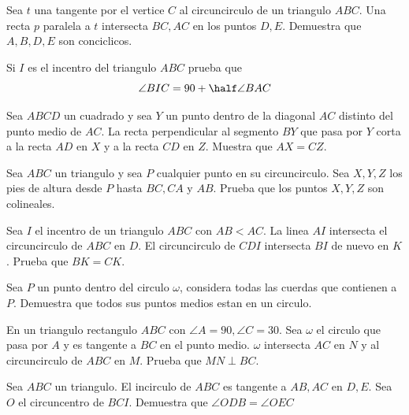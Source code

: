 \documentclass[11pt]{scrartcl}
\newcommand{\thmdifficulty}{0}
\newcommand{\problemdiff}[1]{\renewcommand{\thmdifficulty}{#1}}
\begin{document}
\problemdiff{1}
\begin{problema}
    Sea $t$ una tangente por el vertice $C$ al circuncirculo de un triangulo $ABC$. Una recta $p$ paralela a $t$ intersecta $BC,AC$ en los puntos $D,E$. Demuestra que $A,B,D,E$ son conciclicos. 
\end{problema}

\problemdiff{1}
\begin{problema}
Si $I$ es el incentro del triangulo $ABC$ prueba que 
$$\angle BIC =90+\half \angle BAC$$
\end{problema}


\problemdiff{2}
\begin{problema} 
    Sea $ABCD$ un cuadrado y sea $Y$ un punto dentro de la diagonal $AC$ distinto del punto medio de $AC$. La recta perpendicular al segmento $BY$ que pasa por $Y$ corta a la recta $AD$ en $X$ y a la recta $CD$ en $Z$. Muestra que $AX=CZ$. 
\end{problema}

\problemdiff{2}
\begin{problema}  
    Sea $ABC$ un triangulo y sea $P$ cualquier punto en su circuncirculo. Sea $X,Y,Z$ los pies de altura desde $P$ hasta $BC,CA$ y $AB$. Prueba que los puntos $X,Y,Z$ son colineales.
\end{problema}

\problemdiff{2}
\begin{problema}
    Sea $I$ el incentro de un triangulo $ABC$ con $AB<AC$. La linea $AI$ intersecta el circuncirculo de $ABC$ en $D$. El circuncirculo de $CDI$ intersecta $BI$ de nuevo en $K$. Prueba que $BK=CK$.
\end{problema}

\problemdiff{2}
\begin{problema}
    Sea $P$ un punto dentro del circulo $\omega$, considera todas las cuerdas que contienen a $P$. Demuestra que todos sus puntos medios estan en un circulo.
\end{problema}


\problemdiff{2.5}
\begin{problema}
    En un triangulo rectangulo $ABC$ con $\angle A=90, \angle C=30$. Sea $\omega$ el circulo que pasa por $A$ y es tangente a $BC$ en el punto medio. $\omega$ intersecta $AC$ en $N$ y al circuncirculo de $ABC$ en $M$. Prueba que $MN \perp BC$.
\end{problema}

\problemdiff{3}
\begin{problema}
    Sea $ABC$ un triangulo. El incirculo de $ABC$ es tangente a $AB, AC$ en $D,E$. Sea $O$ el circuncentro de $BCI$. Demuestra que $\angle ODB=\angle OEC$
\end{problema}
\end{document}

